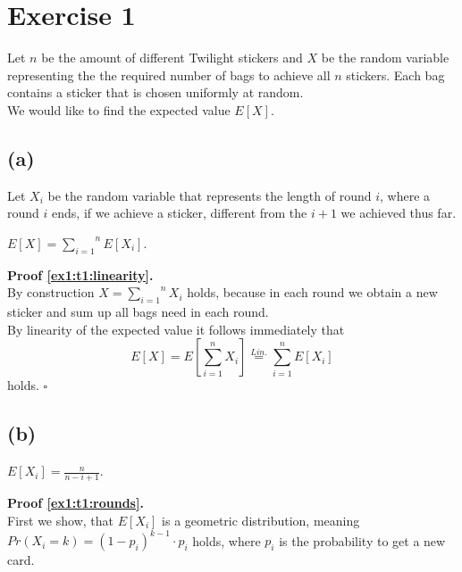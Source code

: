 \section*{Exercise 1} 

Let $n$ be the amount of different Twilight stickers and $X$ be the random variable representing the the required number of bags to achieve all $n$ stickers.
Each bag contains a sticker that is chosen uniformly at random.\\
We would like to find the expected value $E[X]$.


\subsection*{(a)}

Let $X_i$ be the random variable that represents the length of round $i$, where a round $i$ ends, if we achieve a sticker, different from the $i+1$ we
achieved thus far.

\begin{lemma}\label{ex1:t1:linearity}
    $E[X] = \overset{n}{\underset{i=1}{\sum}} E[X_i]$.
\end{lemma}

\textbf{Proof \ref{ex1:t1:linearity}.}\\
By construction $X = \overset{n}{\underset{i=1}{\sum}} X_i$ holds, because in each round we obtain a new sticker
and sum up all bags need in each round.\\
By linearity of the expected value it follows immediately that
$$
    E[X] = E \left[ \sum_{i=1}^{n} X_i \right] \stackrel{Lin.}{=} \sum_{i=1}^{n} E [X_i]
$$
holds.
\mbox{} \hfill $\square$



\subsection*{(b)}

\begin{lemma}\label{ex1:t1:rounds}
    $E[X_i] = \frac{n}{n-i+1}$.
\end{lemma}

\textbf{Proof \ref{ex1:t1:rounds}.}\\
First we show, that $E[ X_i ]$ is a geometric distribution, meaning\\
$Pr (X_i = k) = (1 - p_i)^{k-1} \cdot p_i$ holds,
where $p_i$ is the probability to get a new card.\\

